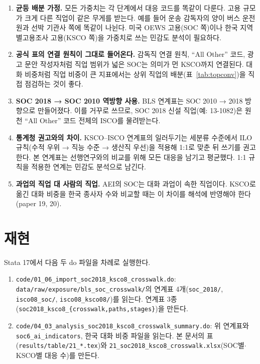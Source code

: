 \documentclass[11pt]{article}
\begin{document}
\begin{enumerate}[leftmargin=*]
  \item \textbf{균등 배분 가정.} 모든 가중치는 각 단계에서 대응 코드를 똑같이 다룬다. 고용 규모가 크게 다른 직업이 같은 무게를 받는다. 예를 들어 운송 감독자의 양이 버스 운전원과 선박 기관사 쪽에 똑같이 나뉜다. 미국 OEWS 고용(SOC 쪽)이나 한국 지역별고용조사 고용(KSCO 쪽)을 가중치로 쓰는 민감도 분석이 필요하다.
  \item \textbf{공식 표의 연결 원칙이 그대로 들어온다.} 감독직 연결 원칙, ``All Other'' 코드, 광고 문안 작성자처럼 직업 범위가 넓은 SOC는 의미가 먼 KSCO까지 연결된다. 대화 비중처럼 직업 비중이 큰 지표에서는 상위 직업의 배분(표~\ref{tab:topconv})을 직접 점검하는 것이 좋다.
  \item \textbf{SOC 2018 → SOC 2010 역방향 사용.} BLS 연계표는 SOC 2010 → 2018 방향으로 만들어졌다. 이를 거꾸로 쓰므로, SOC 2018 신설 직업(예: 13-1082)은 원천 ``All Other'' 코드 전체의 ISCO를 물려받는다.
  \item \textbf{통계청 권고와의 차이.} KSCO–ISCO 연계표의 일러두기는 세분류 수준에서 ILO 규칙(수적 우위 → 직능 수준 → 생산직 우선)을 적용해 1:1로 맞춘 뒤 쓰기를 권고한다. 본 연계표는 선행연구와의 비교를 위해 모든 대응을 남기고 평균했다. 1:1 규칙을 적용한 연계는 민감도 분석으로 남긴다.
  \item \textbf{과업의 직업 대 사람의 직업.} AEI의 SOC는 대화 과업이 속한 직업이다. KSCO로 옮긴 대화 비중을 한국 종사자 수와 비교할 때는 이 차이를 해석에 반영해야 한다(paper 19, 20).
\end{enumerate}

\section{재현}

Stata 17에서 다음 두 do 파일을 차례로 실행한다.
\begin{enumerate}[leftmargin=*]
  \item \texttt{code/01\_06\_import\_soc2018\_ksco8\_crosswalk.do}: \texttt{data/raw/exposure/bls\_soc\_crosswalk/}의 연계표 4개(\texttt{soc\_2018/}, \texttt{isco08\_soc/}, \texttt{isco08\_ksco08/})를 읽는다. 연계표 3종(\texttt{soc2018\_ksco8\_\{crosswalk,paths,stages\}})을 만든다.
  \item \texttt{code/04\_03\_analysis\_soc2018\_ksco8\_crosswalk\_summary.do}: 위 연계표와 \texttt{soc6\_ai\_indicators}, 한국 대화 비중 파일을 읽는다. 본 문서의 표(\texttt{results/table/21\_*.tex})와 \texttt{21\_soc2018\_ksco8\_crosswalk.xlsx}(SOC별$\cdot$KSCO별 대응 수)를 만든다.
\end{enumerate}

\printbibliography[title={참고문헌}]
\end{document}
